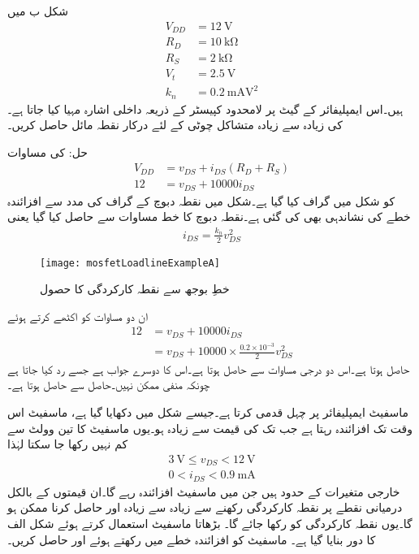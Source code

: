 شکل  ب میں
\begin{align*}
V_{DD}&=\SI{12}{\volt}\\
R_D&=\SI{10}{\kilo \ohm}\\
R_S&=\SI{2}{\kilo \ohm}\\
V_t&=\SI{2.5}{\volt}\\
k_n&=\SI{0.2}{\milli \ampere \volt \squared}
\end{align*}
ہیں۔اس ایمپلیفائر کے گیٹ پر لامحدود کپیسٹر کے ذریعہ داخلی اشارہ مہیا کیا جاتا ہے۔ کی زیادہ سے زیادہ  متشاکل چوٹی کے لئے درکار نقطہ مائل حاصل کریں۔

حل: کی مساوات 
\begin{align*}
V_{DD}&=v_{DS}+i_{DS}\left(R_D+R_S \right)\\
12&=v_{DS}+10000 i_{DS}
\end{align*}
کو شکل  میں گراف کیا گیا ہے۔شکل میں نقطہ دبوچ کے گراف کی مدد سے افزائندہ خطے کی نشاندہی بھی  کی گئی ہے۔نقطہ  دبوچ کا خط مساوات  سے حاصل کیا گیا یعنی 
\begin{align*}
i_{DS}=\tfrac{k_n}{2} v_{DS}^2
\end{align*}
%
\begin{figure}
\centering
\texttt{[image: mosfetLoadlineExampleA]}
\caption{خطِ بوجھ سے نقطہ کارکردگی کا حصول }
\label{شکل_ماسفیٹ_بار_کا_خط_سے_نقطہ _کارکردگی_الف}
\end{figure}

ان دو مساوات کو اکٹھے کرتے  ہوئے
\begin{align*}
12&=v_{DS}+10000 i_{DS}\\
&=v_{DS}+10000 \times \frac{0.2 \times 10^{-3}}{2} v_{DS}^2
\end{align*}
حاصل ہوتا ہے۔اس دو درجی مساوات سے  حاصل ہوتا ہے۔اس کا دوسرے جواب  ہے جسے رد کیا جاتا ہے چونکہ  منفی ممکن نہیں۔حاصل  سے  حاصل ہوتا ہے۔

ماسفیٹ ایمپلیفائر  پر چہل قدمی کرتا ہے۔جیسے شکل میں دکھایا گیا ہے، ماسفیٹ اس وقت تک افزائندہ رہتا ہے جب تک   کی قیمت  سے زیادہ ہو۔یوں ماسفیٹ کا  تین وولٹ سے کم نہیں رکھا جا سکتا لہٰذا
\begin{align*}
\SI{3}{\volt} \le v_{DS} < \SI{12}{\volt}\\
0 < i_{DS} < \SI{0.9}{\milli \ampere}
\end{align*}
خارجی متغیرات کے حدود ہیں جن میں ماسفیٹ افزائندہ رہے گا۔ان قیمتوں کے بالکل درمیانی نقطے پر نقطہ کارکردگی رکھنے سے زیادہ سے زیادہ  اور  حاصل کرنا ممکن ہو گا۔یوں نقطہ کارکردگی کو   رکھا جائے گا۔
 بڑھاتا ماسفیٹ استعمال کرتے ہوئے شکل   الف  کا دور بنایا گیا ہے۔ ماسفیٹ کو افزائندہ خطے میں رکھتے ہوئے  اور  حاصل کریں۔

